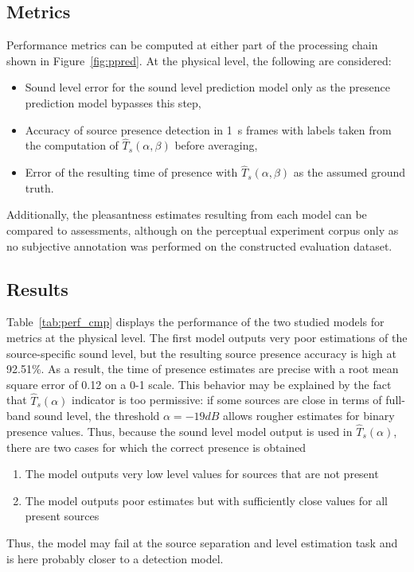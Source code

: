 \documentclass[11pt,a4paper]{article}
\begin{document}
\subsection{Metrics}
\label{sec:pred_metrics}


Performance metrics can be computed at either part of the processing chain shown in Figure~\ref{fig:ppred}. At the physical level, the following are considered:

\begin{itemize}
\item Sound level error for the sound level prediction model only as the presence prediction model bypasses this step,
\item Accuracy of source presence detection in 1~s frames with labels taken from the computation of $\hat T_s(\alpha, \beta)$ before averaging,
\item Error of the resulting time of presence with $\hat T_s(\alpha, \beta)$ as the assumed ground truth.
\end{itemize}

Additionally, the pleasantness estimates resulting from each model can be compared to assessments, although on the perceptual experiment corpus only as no subjective annotation was performed on the constructed evaluation dataset.

\subsection{Results}
\label{sec:pred_res}

Table~\ref{tab:perf_cmp} displays the performance of the two studied models for metrics at the physical level. The first model outputs very poor estimations of the source-specific sound level, but the resulting source presence accuracy is high at 92.51\%. As a result, the time of presence estimates are precise with a root mean square error of 0.12 on a 0-1 scale. This behavior may be explained by the fact that $\hat T_s(\alpha)$ indicator is too permissive: if some sources are close in terms of full-band sound level, the threshold $\alpha = -19dB$ allows rougher estimates for binary presence values. Thus, because the sound level model output is used in $\hat T_s(\alpha)$, there are two cases for which the correct presence is obtained
\begin{enumerate}
\item The model outputs very low level values for sources that are not present
\item The model outputs poor estimates but with sufficiently close values for all present sources
\end{enumerate}
Thus, the model may fail at the source separation and level estimation task and is here probably closer to a detection model.\\
\end{document}
